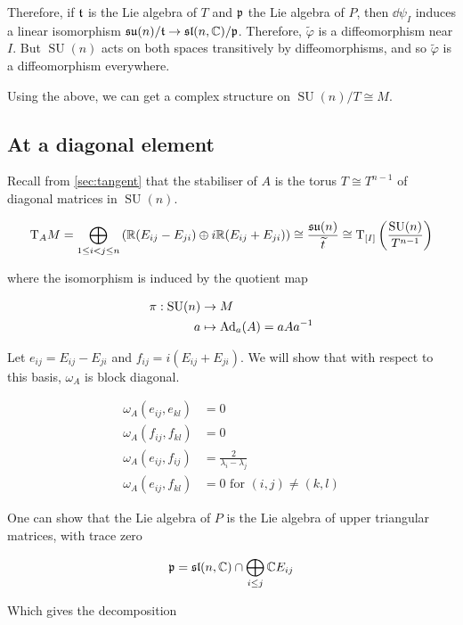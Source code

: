 \documentclass{article}
\DeclareMathOperator{\SU}{SU}
\newcommand{\su}{\mathfrak{su}}
\renewcommand{\sl}{\mathfrak{sl}}
\renewcommand{\tilde}{\widetilde}
\begin{document}
Therefore, if \(\mathfrak{t}\) is the Lie algebra of \(T\) and \(\mathfrak{p}\) the Lie algebra of \(P\), then \(\dd\psi_I\) induces a linear isomorphism \(\su(n)/\mft \to \sl(n, \C)/\mfp\). Therefore, \(\tilde\varphi\) is a diffeomorphism near \(I\). But \(\SU(n)\) acts on both spaces transitively by diffeomorphisms, and so \(\tilde\varphi\) is a diffeomorphism everywhere.

Using the above, we can get a complex structure on \(\SU(n)/T \cong M\).

\subsection{At a diagonal element}

Recall from \cref{sec:tangent} that the stabiliser of \(A\) is the torus \(T \cong T^{n-1}\) of diagonal matrices in \(\SU(n)\).

\[\T_A M = \bigoplus_{1 \le i < j \le n} \left(\R(E_{ij} - E_{ji}) \oplus i\R (E_{ij} + E_{ji})\right) \cong \frac{\su(n)}{\tilde t} \cong \T_{[I]}\left(\frac{\SU(n)}{T^{n-1}}\right)\]

where the isomorphism is induced by the quotient map

\begin{align*}
    \pi : \SU(n) &\to M \\
    a &\mapsto \Ad_a(A) = aAa^{-1}
\end{align*}

Let \(e_{ij} = E_{ij} - E_{ji}\) and \(f_{ij} = i(E_{ij} + E_{ji})\). We will show that with respect to this basis, \(\omega_A\) is block diagonal.

\begin{proposition}
    \label{prop:omega-block-diag}
    \begin{align*}
        \omega_A(e_{ij}, e_{kl}) &= 0 \\
        \omega_A(f_{ij}, f_{kl}) &= 0 \\
        \omega_A(e_{ij}, f_{ij}) &= \frac{2}{\lambda_i - \lambda_j} \\
        \omega_A(e_{ij}, f_{kl}) &= 0 \text{ for }(i, j) \ne (k, l)
    \end{align*}
\end{proposition}

One can show that the Lie algebra of \(P\) is the Lie algebra of upper triangular matrices, with trace zero

\[\mfp = \sl(n, \C) \cap \bigoplus_{i \le j}\C E_{ij}\]

Which gives the decomposition
\end{document}
